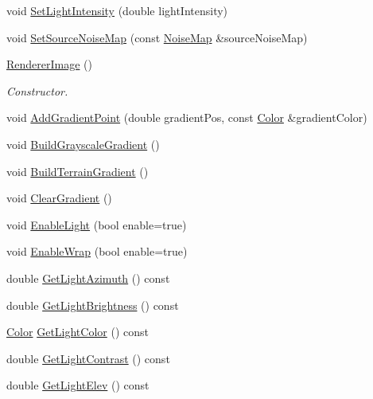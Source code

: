 \begin{DoxyCompactItemize}
void \hyperlink{classnoise_1_1utils_1_1_renderer_image_ae4ca7c9d7b014a289f9f51a4c3365e78}{Set\+Light\+Intensity} (double light\+Intensity)
\item 
void \hyperlink{classnoise_1_1utils_1_1_renderer_image_ab6db6e2627deb4ea2b26e8fdff1794ca}{Set\+Source\+Noise\+Map} (const \hyperlink{classnoise_1_1utils_1_1_noise_map}{Noise\+Map} \&source\+Noise\+Map)
\item 
\hyperlink{classnoise_1_1utils_1_1_renderer_image_a5643f32d47760896aefa37b6a90628de}{Renderer\+Image} ()
\begin{DoxyCompactList}\small\item\em Constructor. \end{DoxyCompactList}\item 
void \hyperlink{classnoise_1_1utils_1_1_renderer_image_a240b99aabdb7be7ba89b715c01e17479}{Add\+Gradient\+Point} (double gradient\+Pos, const \hyperlink{classnoise_1_1utils_1_1_color}{Color} \&gradient\+Color)
\item 
void \hyperlink{classnoise_1_1utils_1_1_renderer_image_a298df190bd6f65ef14bcaca6c596abfa}{Build\+Grayscale\+Gradient} ()
\item 
void \hyperlink{classnoise_1_1utils_1_1_renderer_image_a7b8f446d7c31a31b697c0f56bbdb655d}{Build\+Terrain\+Gradient} ()
\item 
void \hyperlink{classnoise_1_1utils_1_1_renderer_image_a3e197eaf8c8814c859b48ee911e6c9e4}{Clear\+Gradient} ()
\item 
void \hyperlink{classnoise_1_1utils_1_1_renderer_image_a132794038f83055070281eadc54321ba}{Enable\+Light} (bool enable=true)
\item 
void \hyperlink{classnoise_1_1utils_1_1_renderer_image_a31c0090f0bcd8ccf445ae772c99af3cf}{Enable\+Wrap} (bool enable=true)
\item 
double \hyperlink{classnoise_1_1utils_1_1_renderer_image_a24dfd02bc331dbbbea3c3c6bdc75eca4}{Get\+Light\+Azimuth} () const 
\item 
double \hyperlink{classnoise_1_1utils_1_1_renderer_image_a445e457b2dc99d029800b3b5ee4b8489}{Get\+Light\+Brightness} () const 
\item 
\hyperlink{classnoise_1_1utils_1_1_color}{Color} \hyperlink{classnoise_1_1utils_1_1_renderer_image_aeddfe4c76285e98999aab2492bcccdaf}{Get\+Light\+Color} () const 
\item 
double \hyperlink{classnoise_1_1utils_1_1_renderer_image_a8a411fa5f3e79efa428868f8a3daa2f6}{Get\+Light\+Contrast} () const 
\item 
double \hyperlink{classnoise_1_1utils_1_1_renderer_image_a20f55af04669f1b2469d1beaa7968e3d}{Get\+Light\+Elev} () const 

\end{DoxyCompactItemize}
